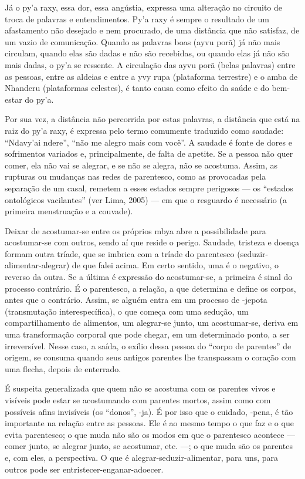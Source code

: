 Já o py’a raxy, essa dor, essa angústia, expressa uma alteração no
circuito de troca de palavras e entendimentos. Py’a raxy é sempre o
resultado de um afastamento não desejado e nem procurado, de uma
distância que não satisfaz, de um vazio de comunicação. Quando as
palavras boas (ayvu porã) já não mais circulam, quando elas são dadas e
não são recebidas, ou quando elas já não são mais dadas, o py’a se
ressente. A circulação das ayvu porã (belas palavras) entre as pessoas,
entre as aldeias e entre a yvy rupa (plataforma terrestre) e o amba de
Nhanderu (plataformas celestes), é tanto causa como efeito da saúde e
do bem-estar do py’a.

Por sua vez, a distância não percorrida por estas palavras, a distância
que está na raiz do py’a raxy, é expressa pelo termo comumente
traduzido como saudade: ``Ndavy’ai ndere'', ``não me alegro mais com
você''. A saudade é fonte de dores e sofrimentos variados e,
principalmente, de falta de apetite. Se a pessoa não quer comer, ela
não vai se alegrar, e se não se alegra, não se acostuma. Assim, as
rupturas ou mudanças nas redes de parentesco, como as provocadas pela
separação de um casal, remetem a esses estados sempre perigosos --- os
``estados ontológicos vacilantes'' (ver Lima, 2005) --- em que o resguardo
é necessário (a primeira menstruação e a couvade). 

Deixar de acostumar-se entre os próprios mbya abre a possibilidade para
acostumar-se com outros, sendo aí que reside o perigo. Saudade,
tristeza e doença formam outra tríade, que se imbrica com a tríade do
parentesco (seduzir-alimentar-alegrar) de que falei acima. Em certo
sentido, uma é o negativo, o reverso da outra. Se a última é expressão
do acostumar-se, a primeira é sinal do processo contrário. É o
parentesco, a relação, a que determina e define os corpos, antes que o
contrário. Assim, se alguém entra em um processo de -jepota
(transmutação interespecífica), o que começa com uma sedução, um
compartilhamento de alimentos, um alegrar-se junto, um acostumar-se,
deriva em uma transformação corporal que pode chegar, em um determinado
ponto, a ser irreversível. Nesse caso, a saída, o exílio dessa pessoa
do ``corpo de parentes'' de origem, se consuma quando seus antigos
parentes lhe transpassam o coração com uma flecha, depois de
enterrado. 

É suspeita generalizada que quem não se acostuma com os parentes vivos e
visíveis pode estar se acostumando com parentes mortos, assim como com
possíveis afins invisíveis (os ``donos'', -ja). É por isso que o cuidado,
-pena, é tão importante na relação entre as pessoas. Ele é ao mesmo
tempo o que faz e o que evita parentesco; o que muda não são os modos
em que o parentesco acontece --- comer junto, se alegrar junto, se
acostumar, etc. ---; o que muda são os parentes e, com eles, a
perspectiva. O que é alegrar-seduzir-alimentar, para uns, para outros
pode ser entristecer-enganar-adoecer. 

